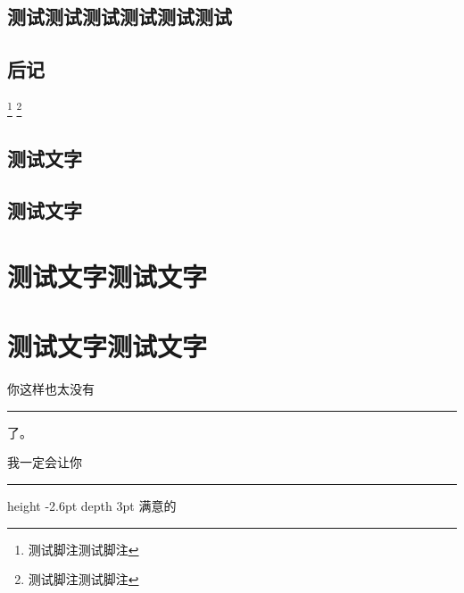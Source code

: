 \documentclass[themecolor=brown]{textbook-cn}%
\begin{document}
\chapter{测试测试测试测试测试测试}

{\FontSizeSet[3.0]{14pt}
\zhlipsum[1]

}
%
\backmatter
%
%
%
\chapter{后记}
\footnote{测试脚注测试脚注}
\lipsum
\footnote{测试脚注测试脚注}
%
%
%
\chapter{测试文字}
\zhlipsum

\cleardoublepage

\lipsum
%
%
%
\chapter{测试文字}







{
\FontSizeSet[1.0]{14pt}
\zhlipsum[2]
}

\partintro{\lipsum[2]}
\part*{测试文字测试文字}

\zhlipsum
%
%
\partsubtitle{ }
\partintro{\lipsum[2]}
\part*{测试文字测试文字}
%
\zhlipsum

你这样也太没有 \leaders \hrule{} 了。

我一定会让你 \leaders \hrule height
-2.6pt depth 3pt \hskip 2cm 满意的
\end{document}

